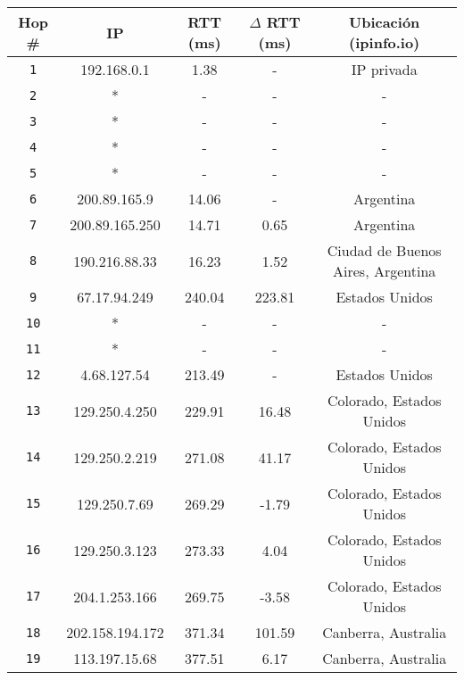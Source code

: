 \begin{table}[H]\begin{center}
    \begin{tabular}{|c|c|c|c|c|}
    \hline
    \textbf{Hop \#} & \textbf{IP}& \textbf{RTT (ms)} & \textbf{$\Delta$ RTT (ms)} & \textbf{Ubicación (ipinfo.io)} \\ \hline
    \texttt{1} & 192.168.0.1      & 1.38    & -       & IP privada  \\ \hline
    \texttt{2} & *                & -       & -       & -   \\ \hline
    \texttt{3} & *                & -       & -       & -   \\ \hline
    \texttt{4} & *                & -       & -       & -   \\ \hline
    \texttt{5} & *                & -       & -       & -   \\ \hline
    \texttt{6} & 200.89.165.9     & 14.06   & -       & Argentina    \\ \hline
    \texttt{7} & 200.89.165.250   & 14.71    & 0.65   & Argentina   \\ \hline
    \texttt{8} & 190.216.88.33    & 16.23    & 1.52  & Ciudad de Buenos Aires, Argentina   \\ \hline
    \texttt{9} & 67.17.94.249     & 240.04  & 223.81 & Estados Unidos   \\ \hline
    \texttt{10} & *               & -       & -       & -   \\ \hline
    \texttt{11} & *               & -       & -       & -    \\ \hline
    \texttt{12} & 4.68.127.54     & 213.49  & -       & Estados Unidos   \\ \hline
    \texttt{13} & 129.250.4.250   & 229.91  & 16.48    & Colorado, Estados Unidos   \\ \hline
    \texttt{14} & 129.250.2.219   & 271.08  & 41.17   & Colorado, Estados Unidos   \\ \hline
    \texttt{15} & 129.250.7.69    & 269.29  & -1.79   & Colorado, Estados Unidos   \\ \hline
    \texttt{16} & 129.250.3.123   & 273.33  & 4.04    & Colorado, Estados Unidos    \\ \hline
    \texttt{17} & 204.1.253.166   & 269.75  & -3.58   & Colorado, Estados Unidos   \\ \hline
    \texttt{18} & 202.158.194.172 & 371.34  & 101.59   & Canberra, Australia   \\ \hline
    \texttt{19} & 113.197.15.68   & 377.51  & 6.17    & Canberra, Australia   \\ \hline

\end{tabular}
\end{center}
\end{table}
